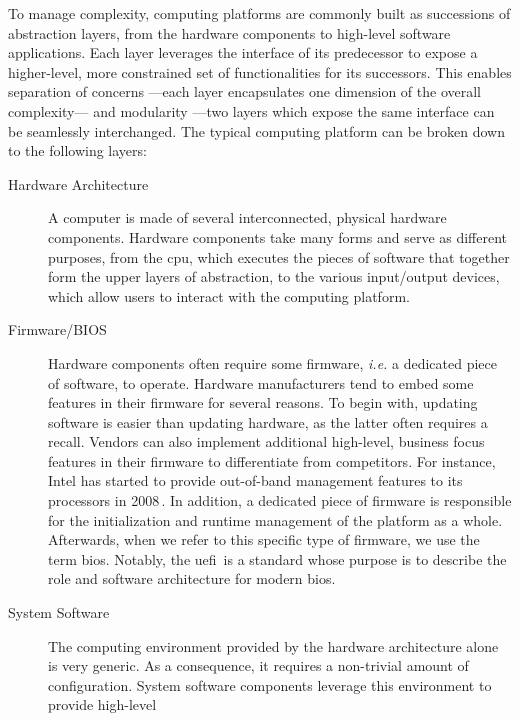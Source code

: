 To manage complexity, computing platforms are commonly built as successions of
abstraction layers, from the hardware components to high-level software
applications.
%
Each layer leverages the interface of its predecessor to expose a higher-level,
more constrained set of functionalities for its successors.
%
This enables separation of concerns ---each layer encapsulates one dimension of
the overall complexity--- and modularity ---two layers which expose the same
interface can be seamlessly interchanged.
%
The typical computing platform can be broken down to the following layers:
%
\begin{description}
\item [Hardware Architecture]
  A computer is made of several inter\-connected, physical hardware components.
  Hardware components take many forms and serve as different purposes, from the
  \ac{cpu}, which executes the pieces of software that together form the upper
  layers of abstraction, to the various input/output devices, which allow users
  to interact with the computing platform.
\item [Firmware/BIOS]
  Hardware components often require some firm\-ware, \emph{i.e.} a dedicated
  piece of software, to operate.
  Hardware manufacturers tend to embed some features in their firmware for
  several reasons.
  To begin with, updating software is easier than updating hardware, as the
  latter often requires a recall.
  Vendors can also implement additional high-level, business focus features in
  their firmware to differentiate from competitors.
  For instance, Intel has started to provide out-of-band management features to
  its processors in 2008\,\cite{ruan2014me}.
  In addition, a dedicated piece of firmware is responsible for the
  initialization and runtime management of the platform as a whole.
  Afterwards, when we refer to this specific type of firmware, we use the term
  \ac{bios}.
  Notably, the \ac{uefi}\,\cite{uefi2017uefi} is a standard whose purpose is to
  describe the role and software architecture for modern \ac{bios}.
\item [System Software]
  The computing environment provided by the hardware architecture alone is very
  generic.
  As a consequence, it requires a non-trivial amount of configuration.
  System software components leverage this environment to provide high-level

\end{description}
